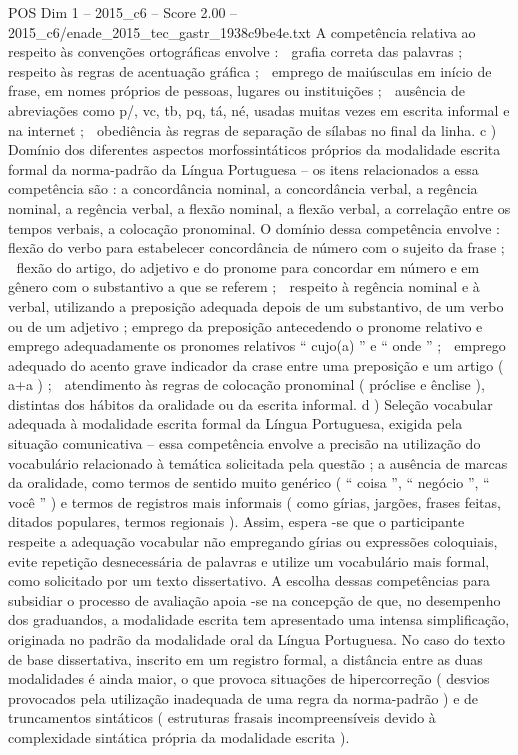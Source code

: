 \begin{textsample}{POS Dim 1 – 2015\_c6 – Score 2.00 – 2015\_c6/enade\_2015\_tec\_gastr\_1938c9be4e.txt}
A competência relativa ao respeito às convenções ortográficas envolve :  grafia correta das palavras ;  respeito às regras de acentuação gráfica ;  emprego de maiúsculas em início de frase, em nomes próprios de pessoas, lugares ou instituições ;  ausência de abreviações como p/, vc, tb, pq, tá, né, usadas muitas vezes em escrita informal e na internet ;  obediência às regras de separação de sílabas no final da linha. c ) Domínio dos diferentes aspectos morfossintáticos próprios da modalidade escrita formal da norma-padrão da Língua Portuguesa – os itens relacionados a essa competência são : a concordância nominal, a concordância verbal, a regência nominal, a regência verbal, a flexão nominal, a flexão verbal, a correlação entre os tempos verbais, a colocação pronominal.
O domínio dessa competência envolve :  flexão do verbo para estabelecer concordância de número com o sujeito da frase ;  flexão do artigo, do adjetivo e do pronome para concordar em número e em gênero com o substantivo a que se referem ;  respeito à regência nominal e à verbal, utilizando a preposição adequada depois de um substantivo, de um verbo ou de um adjetivo ; emprego da preposição antecedendo o pronome relativo e emprego adequadamente os pronomes relativos “ cujo(a) ” e “ onde ” ;  emprego adequado do acento grave indicador da crase entre uma preposição e um artigo ( a+a ) ;  atendimento às regras de colocação pronominal ( próclise e ênclise ), distintas dos hábitos da oralidade ou da escrita informal. d ) Seleção vocabular adequada à modalidade escrita formal da Língua Portuguesa, exigida pela situação comunicativa – essa competência envolve a precisão na utilização do vocabulário relacionado à temática solicitada pela questão ; a ausência de marcas da oralidade, como termos de sentido muito genérico ( “ coisa ”, “ negócio ”, “ você ” ) e termos de registros mais informais ( como gírias, jargões, frases feitas, ditados populares, termos regionais ).
Assim, espera -se que o participante respeite a adequação vocabular não empregando gírias ou expressões coloquiais, evite repetição desnecessária de palavras e utilize um vocabulário mais formal, como solicitado por um texto dissertativo.
A escolha dessas competências para subsidiar o processo de avaliação apoia -se na concepção de que, no desempenho dos graduandos, a modalidade escrita tem apresentado uma intensa simplificação, originada no padrão da modalidade oral da Língua Portuguesa.
No caso do texto de base dissertativa, inscrito em um registro formal, a distância entre as duas modalidades é ainda maior, o que provoca situações de hipercorreção ( desvios provocados pela utilização inadequada de uma regra da norma-padrão ) e de truncamentos sintáticos ( estruturas frasais incompreensíveis devido à complexidade sintática própria da modalidade escrita ).

\end{textsample}
